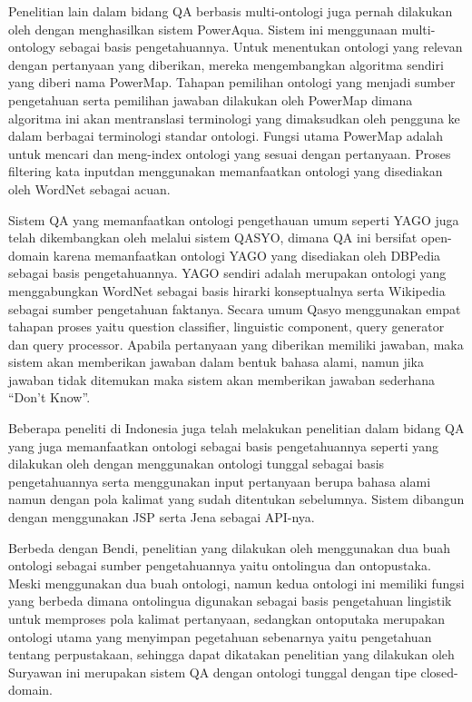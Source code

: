 Penelitian lain dalam bidang QA berbasis multi-ontologi juga pernah dilakukan oleh \citet*{lopez} dengan menghasilkan sistem PowerAqua. Sistem ini menggunaan multi-ontology sebagai basis pengetahuannya. Untuk menentukan ontologi yang relevan dengan pertanyaan yang diberikan, mereka  mengembangkan algoritma sendiri yang diberi nama PowerMap. Tahapan pemilihan ontologi yang menjadi sumber pengetahuan serta pemilihan jawaban dilakukan oleh PowerMap dimana algoritma ini akan mentranslasi terminologi yang dimaksudkan oleh pengguna ke dalam berbagai terminologi standar ontologi. Fungsi utama PowerMap adalah untuk mencari dan meng-index ontologi yang sesuai dengan pertanyaan. Proses filtering kata inputdan menggunakan memanfaatkan ontologi yang disediakan oleh WordNet sebagai acuan.

Sistem QA yang memanfaatkan ontologi pengethauan umum seperti YAGO juga telah dikembangkan oleh \citet*{moussa_kader} melalui sistem QASYO, dimana QA ini bersifat open-domain karena memanfaatkan ontologi YAGO yang disediakan oleh DBPedia sebagai basis pengetahuannya. YAGO sendiri adalah merupakan ontologi yang menggabungkan WordNet sebagai basis hirarki konseptualnya serta Wikipedia sebagai sumber pengetahuan faktanya. Secara umum Qasyo menggunakan empat tahapan proses yaitu question classifier, linguistic component, query generator dan query processor. Apabila pertanyaan yang diberikan memiliki jawaban, maka sistem akan memberikan jawaban dalam bentuk bahasa alami, namun jika jawaban tidak ditemukan maka sistem akan memberikan jawaban sederhana ``Don't Know''.

Beberapa peneliti di Indonesia juga telah melakukan penelitian dalam bidang QA yang juga memanfaatkan ontologi sebagai basis pengetahuannya seperti yang dilakukan oleh \citet{bendi} dengan menggunakan ontologi tunggal sebagai basis pengetahuannya serta menggunakan input pertanyaan berupa bahasa alami namun dengan pola kalimat yang sudah ditentukan sebelumnya. Sistem dibangun dengan menggunakan JSP serta Jena sebagai API-nya.

Berbeda dengan Bendi, penelitian yang dilakukan oleh \citet{suryawan} menggunakan dua buah ontologi sebagai sumber pengetahuannya yaitu ontolingua dan ontopustaka. Meski menggunakan dua buah ontologi, namun kedua ontologi ini memiliki fungsi yang berbeda dimana ontolingua digunakan sebagai basis pengetahuan lingistik untuk memproses pola kalimat pertanyaan, sedangkan ontoputaka merupakan ontologi utama yang menyimpan pegetahuan sebenarnya yaitu pengetahuan tentang perpustakaan, sehingga dapat dikatakan penelitian yang dilakukan oleh Suryawan ini merupakan sistem QA dengan ontologi tunggal dengan tipe closed-domain.

